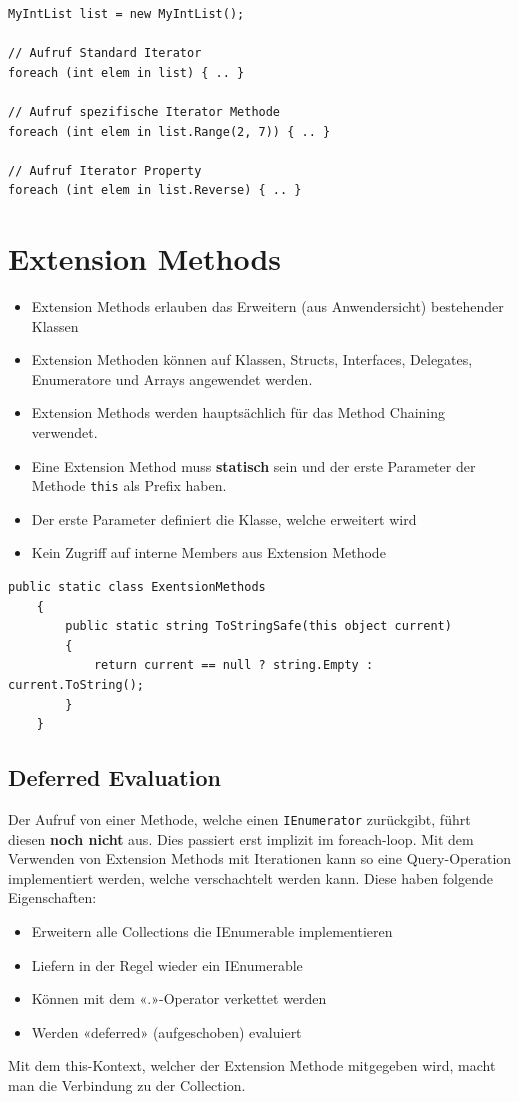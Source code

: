 \documentclass[
a4paper,
oneside,
10pt,
fleqn,
headsepline,
toc=listofnumbered, 
bibliography=totocnumbered]{scrartcl}
\let\stdsection\section
\renewcommand\section{\clearpage\stdsection}
\begin{document}
\begin{lstlisting}
MyIntList list = new MyIntList();

// Aufruf Standard Iterator
foreach (int elem in list) { .. }

// Aufruf spezifische Iterator Methode
foreach (int elem in list.Range(2, 7)) { .. }

// Aufruf Iterator Property
foreach (int elem in list.Reverse) { .. }
\end{lstlisting}

\clearpage

\section{Extension Methods}
\begin{itemize}
	\item Extension Methods erlauben das Erweitern (aus Anwendersicht) bestehender Klassen
	\item Extension Methoden können auf Klassen, Structs, Interfaces, Delegates, Enumeratore und Arrays angewendet werden.
	\item Extension Methods werden hauptsächlich für das Method Chaining verwendet.
	\item Eine Extension Method muss \textbf{statisch} sein und der erste Parameter der Methode \lstinline|this| als Prefix haben. 
	\item Der erste Parameter definiert die Klasse, welche erweitert wird
	\item Kein Zugriff auf interne Members aus Extension Methode 
\end{itemize}

\begin{lstlisting}[language=sharpc]
 public static class ExentsionMethods
    {
        public static string ToStringSafe(this object current)
        {
            return current == null ? string.Empty : current.ToString();
        }
    }
\end{lstlisting}
\subsection{Deferred Evaluation}
Der Aufruf von einer Methode, welche einen \lstinline|IEnumerator| zurückgibt, führt diesen \textbf{noch nicht} aus.
Dies passiert erst implizit im foreach-loop.
Mit dem Verwenden von Extension Methods mit Iterationen kann so eine Query-Operation implementiert werden, welche verschachtelt werden kann. Diese haben folgende Eigenschaften:
\begin{itemize}
    \item Erweitern alle Collections die IEnumerable implementieren
    \item Liefern in der Regel wieder ein IEnumerable
    \item Können mit dem «.»-Operator verkettet werden
    \item Werden «deferred» (aufgeschoben) evaluiert
\end{itemize}
Mit dem this-Kontext, welcher der Extension Methode mitgegeben wird, macht man die Verbindung zu der Collection.
\end{document}
